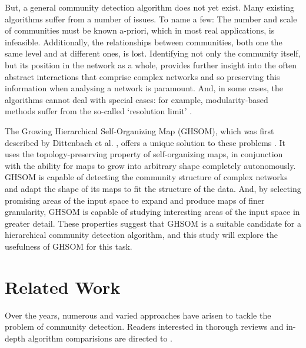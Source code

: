 \documentclass{article}
\begin{document}
But, a general community detection algorithm does not yet exist.
Many existing algorithms suffer from a number of issues. 
To name a few:
The number and scale of communities must be known a-priori, which in most real applications, is infeasible.
Additionally, the relationships between communities, both one the same level and at different ones, is lost.
Identifying not only the community itself, but its position in the network as a whole, provides further insight into the often abstract interactions that comprise complex networks and so preserving this information when analysing a network is paramount.
And, in some cases, the algorithms cannot deal with special cases: for example, modularity-based methods suffer from the so-called `resolution limit' \cite{fortunato2007resolution}.
 
The Growing Hierarchical Self-Organizing Map (GHSOM), which was first described by Dittenbach et al. \cite{dittenbach2000growing},
offers a unique solution to these problems .
It uses the topology-preserving property of self-organizing maps, in conjunction with the ability for maps to grow into arbitrary shape completely autonomously. 
GHSOM is capable of detecting the community structure of complex networks and adapt the shape of its maps to fit the structure of the data.  
And, by selecting promising areas of the input space to expand and produce maps of finer granularity, GHSOM is capable of studying interesting areas of  the input space in greater detail.
These properties suggest that GHSOM is a suitable candidate for a hierarchical community detection algorithm, and this study will explore the usefulness of GHSOM for this task.

\section{Related Work}
Over the years, numerous and varied approaches have arisen to tackle the problem of community detection. 
Readers interested in thorough reviews and in-depth algorithm comparisions are directed to  \cite{fortunato2010community}.
\end{document}
